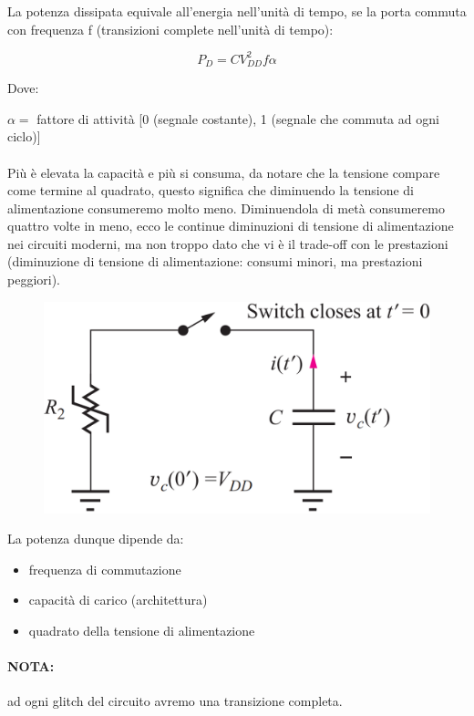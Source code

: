 La	potenza dissipata equivale all'energia nell'unità di	tempo, se	la	porta	commuta con	frequenza f (transizioni complete nell'unità di tempo):

\begin{equation*}
    P_D = CV_{DD}^2f\alpha
\end{equation*}

Dove:

$\alpha = $ fattore di attività [0 (segnale costante), 1 (segnale che commuta ad ogni ciclo)]

\paragraph{}

Più è elevata la capacità e più si consuma, da notare che la tensione compare come termine al quadrato, questo significa che diminuendo la tensione di alimentazione consumeremo molto meno. Diminuendola di metà consumeremo quattro volte in meno, ecco le continue diminuzioni di tensione di alimentazione nei circuiti moderni, ma non troppo dato che vi è il trade-off con le prestazioni (diminuzione di tensione di alimentazione: consumi minori, ma prestazioni peggiori).


\begin{figure}[htbp]
    \centering
    \includegraphics[width=0.5\linewidth]{img/adlsocn.png}
    
    
\end{figure}

La potenza dunque dipende da:

\begin{itemize}
    \item frequenza di	commutazione
    \item capacità di	carico (architettura)
    \item quadrato della tensione di alimentazione
\end{itemize}

\paragraph{NOTA:} ad ogni glitch del circuito avremo una transizione completa.

